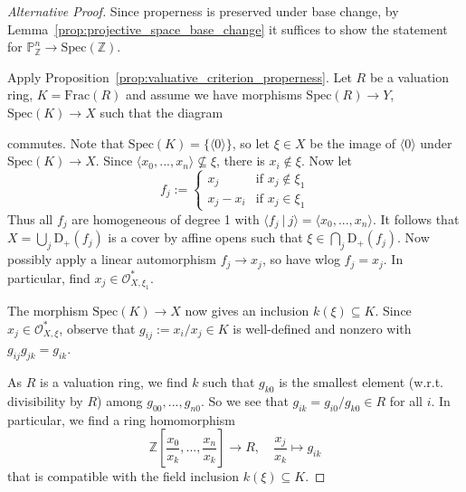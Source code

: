\documentclass{scrartcl}
\newcommand{\Z}{\mathbb{Z}}
\newcommand{\D}[1]{\mathrm{D}_+(#1)}
\renewcommand{\P}{\mathbb{P}}
\newcommand{\Spec}{\mathrm{Spec}}
\newcommand{\Frac}{\mathrm{Frac}}
\renewcommand{\O}{\mathcal{O}}
\theoremstyle{definition}
\begin{document}
\begin{proof}[Alternative Proof]
    Since properness is preserved under base change, by Lemma~\ref{prop:projective_space_base_change} it suffices to show the statement for $\P_\Z^n \to \Spec(\Z)$.

    Apply Proposition~\ref{prop:valuative_criterion_properness}.
    Let $R$ be a valuation ring, $K = \Frac(R)$ and assume we have morphisms $\Spec(R) \to Y$, $\Spec(K) \to X$ such that the diagram
    \begin{center}
    \end{center}
    commutes.
    Note that $\Spec(K) = \{ \langle 0 \rangle \}$, so let $\xi \in X$ be the image of $\langle 0 \rangle$ under $\Spec(K) \to X$.
    Since $\langle x_0, ..., x_n \rangle \not\subseteq \xi$, there is $x_i \not\in \xi$.
    Now let
    \begin{equation*}
        f_j := \begin{cases}
            x_j & \text{if $x_j \notin \xi_1$} \\
            x_j - x_i & \text{if $x_j \in \xi_1$}
        \end{cases}
    \end{equation*}
    Thus all $f_j$ are homogeneous of degree 1 with $\langle f_j \ | \ j \rangle = \langle x_0, ..., x_n \rangle$.
    It follows that $X = \bigcup_j \D{f_j}$ is a cover by affine opens such that $\xi \in \bigcap_j \D{f_j}$.
    Now possibly apply a linear automorphism $f_j \to x_j$, so have wlog $f_j = x_j$.
    In particular, find $x_j \in \O_{X, \xi_1}^*$.

    The morphism $\Spec(K) \to X$ now gives an inclusion $k(\xi) \subseteq K$.
    Since $x_j \in \O_{X, \xi}^*$, observe that $g_{ij} := x_i / x_j \in K$ is well-defined and nonzero with $g_{ij} g_{jk} = g_{ik}$.

    As $R$ is a valuation ring, we find $k$ such that $g_{k0}$ is the smallest element (w.r.t. divisibility by $R$) among $g_{00}, ..., g_{n0}$.
    So we see that $g_{ik} = g_{i0} / g_{k0} \in R$ for all $i$.
    In particular, we find a ring homomorphism
    \begin{equation*}
        \Z\left[ \frac {x_0} {x_k}, ..., \frac {x_n} {x_k} \right] \to R, \quad \frac {x_j} {x_k} \mapsto g_{i k}
    \end{equation*}
    that is compatible with the field inclusion $k(\xi) \subseteq K$.


\end{proof}
\end{document}
